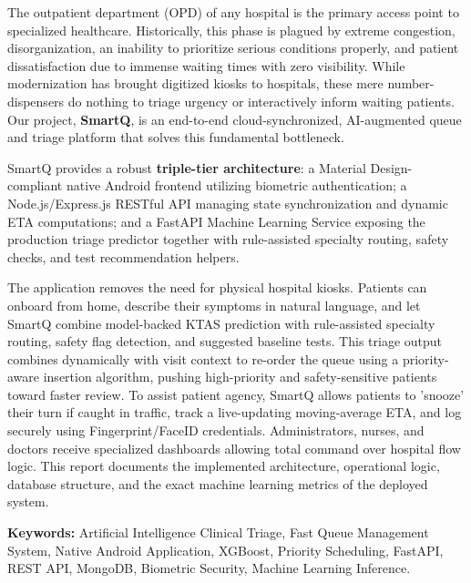\documentclass[12pt,a4paper]{article}
\begin{document}
The outpatient department (OPD) of any hospital is the primary access point to specialized healthcare. Historically, this phase is plagued by extreme congestion, disorganization, an inability to prioritize serious conditions properly, and patient dissatisfaction due to immense waiting times with zero visibility. While modernization has brought digitized kiosks to hospitals, these mere number-dispensers do nothing to triage urgency or interactively inform waiting patients. Our project, \textbf{SmartQ}, is an end-to-end cloud-synchronized, AI-augmented queue and triage platform that solves this fundamental bottleneck.

SmartQ provides a robust \textbf{triple-tier architecture}: a Material Design-compliant native Android frontend utilizing biometric authentication; a Node.js/Express.js RESTful API managing state synchronization and dynamic ETA computations; and a FastAPI Machine Learning Service exposing the production triage predictor together with rule-assisted specialty routing, safety checks, and test recommendation helpers.

The application removes the need for physical hospital kiosks. Patients can onboard from home, describe their symptoms in natural language, and let SmartQ combine model-backed KTAS prediction with rule-assisted specialty routing, safety flag detection, and suggested baseline tests. This triage output combines dynamically with visit context to re-order the queue using a priority-aware insertion algorithm, pushing high-priority and safety-sensitive patients toward faster review. To assist patient agency, SmartQ allows patients to 'snooze' their turn if caught in traffic, track a live-updating moving-average ETA, and log securely using Fingerprint/FaceID credentials. Administrators, nurses, and doctors receive specialized dashboards allowing total command over hospital flow logic. This report documents the implemented architecture, operational logic, database structure, and the exact machine learning metrics of the deployed system.

\vspace{0.5em}
\noindent\textbf{Keywords:} Artificial Intelligence Clinical Triage, Fast Queue Management System, Native Android Application, XGBoost, Priority Scheduling, FastAPI, REST API, MongoDB, Biometric Security, Machine Learning Inference.

\newpage

\end{document}
